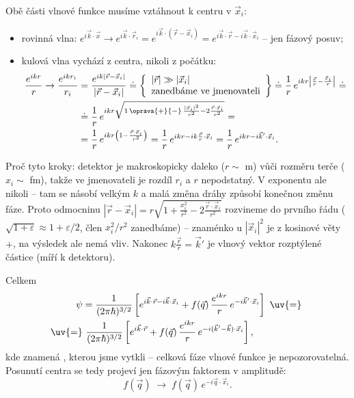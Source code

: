 Obě části vlnové funkce musíme vztáhnout k centru v $\vec x_i$:
\begin{itemize}[leftmargin=1.5em]
  \item rovinná vlna: $e^{i\vec k\cdot\vec x}\to e^{i\vec k\cdot\vec r_i} = e^{i\vec k\cdot(\vec r-\vec x_i)} = e^{i\vec k\cdot\vec r - i\vec k\cdot\vec x_i}$ -- jen fázový posuv;
  \item kulová vlna vychází z centra, nikoli z počátku:
  \begin{align*}
    \frac{e^{ikr}}{r}\to\frac{e^{ikr_i}}{r_i} &= \frac{e^{ik|\vec r-\vec x_i|}}{|\vec r-\vec x_i|}
    \doteq \left\{\begin{array}{l}|\vec r|\gg|\vec x_i|\\ \text{zanedbáme ve jmenovateli}\end{array}\right\}
    \doteq \frac1r\,e^{ikr\left|\frac{\vec r}{r}-\frac{\vec x_i}{r}\right|} \doteq \\
    &\doteq \frac1r\,e^{ikr\sqrt{1\,\oprava{+}{-}\,\frac{|\vec x_i|^2}{r^2}-2\frac{\vec r\cdot\vec x_i}{r^2}}} = \\
    &= \frac1r\,e^{ikr\left(1-\frac{\vec r\cdot\vec x_i}{r^2}\right)} = \frac1r\,e^{ikr - ik\frac{\vec r}{r}\cdot\vec x_i} = \frac1r\,e^{ikr-i\vec k'\cdot\vec x_i}.
  \end{align*}
\end{itemize}
Proč tyto kroky: detektor je makroskopicky daleko ($r\sim$ m) vůči rozměru terče ($x_i\sim$ fm), takže ve jmenovateli je rozdíl $r_i$ a $r$ nepodstatný. V exponentu ale nikoli -- tam se násobí velkým $k$ a malá změna dráhy způsobí konečnou změnu fáze. Proto odmocninu $|\vec r-\vec x_i| = r\sqrt{1+\frac{x_i^2}{r^2}-2\frac{\vec r\cdot\vec x_i}{r^2}}$ rozvineme do prvního řádu ($\sqrt{1+\varepsilon}\approx1+\varepsilon/2$, člen $x_i^2/r^2$ zanedbáme) -- znaménko u $|\vec x_i|^2$ je z kosinové věty $+$, na výsledek ale nemá vliv. Nakonec $k\frac{\vec r}{r} = \vec k'$ je vlnový vektor rozptýlené částice (míří k detektoru).

Celkem
\begin{align}
  \psi &= \frac{1}{(2\pi\hbar)^{3/2}}\left[e^{i\vec k\cdot\vec r - i\vec k\cdot\vec x_i} + f(\vec q)\,\frac{e^{ikr}}{r}\,e^{-i\vec k'\cdot\vec x_i}\right]
  \ \text{\uv{=}}\ \\
  \text{\uv{=}}&\ \frac{1}{(2\pi\hbar)^{3/2}}\left[e^{i\vec k\cdot\vec r} + f(\vec q)\,\frac{e^{ikr}}{r}\,e^{-i(\vec k'-\vec k)\cdot\vec x_i}\right],
\end{align}
kde \uv{$=$} znamená , kterou jsme vytkli -- celková fáze vlnové funkce je nepozorovatelná. Posunutí centra se tedy projeví jen fázovým faktorem v amplitudě:
\begin{equation}
  f(\vec q)\;\longrightarrow\; f(\vec q)\,e^{-i\vec q\cdot\vec x_i}.
\end{equation}

